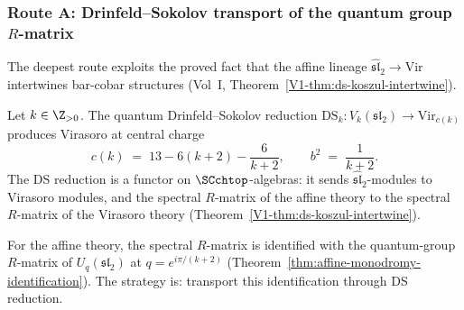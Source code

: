 \subsubsection{Route A: Drinfeld--Sokolov transport of the quantum
group $R$-matrix}
\label{subsubsec:route-A-DS}

The deepest route exploits the proved fact that the affine lineage
$\widehat{\mathfrak{sl}}_2 \to \mathrm{Vir}$ intertwines bar-cobar
structures (Vol~I, Theorem~\ref*{V1-thm:ds-koszul-intertwine}).

\begin{setup}
\label{setup:ds-funnel}
Let $k \in \Z_{>0}$. The quantum Drinfeld--Sokolov
reduction $\mathrm{DS}_k \colon V_k(\mathfrak{sl}_2) \to
\mathrm{Vir}_{c(k)}$ produces Virasoro at central charge
\begin{equation}\label{eq:DS-central-charge}
c(k) \;=\; 13 - 6(k+2) - \frac{6}{k+2},
\qquad
b^2 \;=\; \frac{1}{k+2}.
\end{equation}
The DS reduction is a functor on $\SCchtop$-algebras: it sends
$\widehat{\mathfrak{sl}}_2$-modules to Virasoro modules, and
the spectral $R$-matrix of the affine theory to the spectral
$R$-matrix of the Virasoro theory
(Theorem~\ref*{V1-thm:ds-koszul-intertwine}).
\end{setup}

For the affine theory, the spectral $R$-matrix is identified with
the quantum-group $R$-matrix of $U_q(\mathfrak{sl}_2)$ at
$q = e^{i\pi/(k+2)}$
(Theorem~\ref{thm:affine-monodromy-identification}). The strategy
is: transport this identification through DS reduction.

